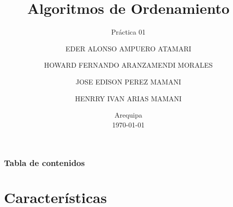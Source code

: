 \documentclass[
	11pt, %
]{beamer}
\title[ALG ORD]{Algoritmos de Ordenamiento} %
\subtitle{Práctica 01} %
\author[ ]{
EDER ALONSO AMPUERO ATAMARI\\ \and
HOWARD FERNANDO ARANZAMENDI MORALES\\ \and
JOSE EDISON PEREZ MAMANI\\ \and
HENRRY IVAN ARIAS MAMANI} %
\institute[UC]{Universidad Nacional San Agustín de Arequipa \\ \smallskip \textit{ }} %
\date[\today]{Arequipa \\ \today} %
\begin{document}

\begin{frame}
	\titlepage %
\end{frame}



\begin{frame}
	\frametitle{Tabla de contenidos} %
	
	\tableofcontents %
\end{frame}


\section{Características} %
\end{document}
